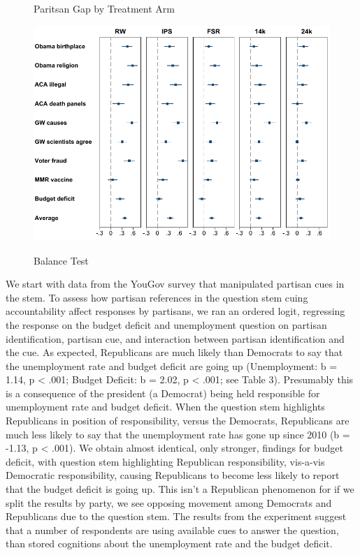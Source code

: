 \documentclass[12pt, letterpaper]{article}
\begin{document}
\begin{center}
\begin{figure}[H]
  \centering
  \caption{Paritsan Gap by Treatment Arm}
  \includegraphics[scale=.8]{../figs/partisan-gap-by-item-arm.pdf}
  \label{fig:figbias}
  \caption*{Balance Test}
\end{figure}
\end{center}

We start with data from the YouGov survey that manipulated partisan cues in the stem. To assess how partisan references in the question stem cuing accountability affect responses by partisans, we ran an ordered logit, regressing the response on the budget deficit and unemployment question on partisan identification, partisan cue, and interaction between partisan identification and the cue. As expected, Republicans are much likely than Democrats to say that the unemployment rate and budget deficit are going up (Unemployment: b = 1.14, p < .001; Budget Deficit: b = 2.02, p < .001; see Table 3). Presumably this is a consequence of the president (a Democrat) being held responsible for unemployment rate and budget deficit. When the question stem highlights Republicans in position of responsibility, versus the Democrats, Republicans are much less likely to say that the unemployment rate has gone up since 2010 (b = -1.13, p < .001). We obtain almost identical, only stronger, findings for budget deficit, with question stem highlighting Republican responsibility, vis-a-vis Democratic responsibility, causing Republicans to become less likely to report that the budget deficit is going up. This isn’t a Republican phenomenon for if we split the results by party, we see opposing movement among Democrats and Republicans due to the question stem. The results from the experiment suggest that a number of respondents are using available cues to answer the question, than stored cognitions about the unemployment rate and the budget deficit. 
\end{document}
